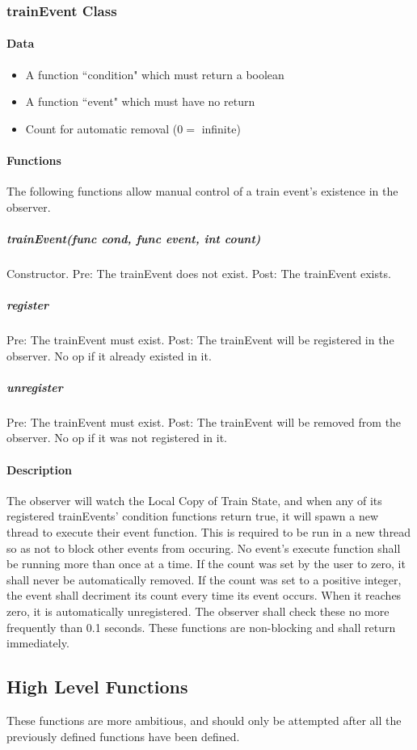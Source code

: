 \documentclass[a4paper,11pt,notitlepage]{article}
\def\LC{Local Copy of Train State\xspace}
\begin{document}
\subsubsection{trainEvent Class}
\paragraph{Data}
\begin{itemize}
\item A function ``condition" which must return a boolean
\item A function ``event" which must have no return
\item Count for automatic removal ($0 =$ infinite)
\end{itemize}
\paragraph{Functions}
The following functions allow manual control of a train event's existence in the observer.
\subparagraph{trainEvent(func cond, func event, int count)} Constructor. Pre: The trainEvent does not exist. Post: The trainEvent exists.
\subparagraph{register} Pre: The trainEvent must exist. Post: The trainEvent will be registered in the observer. No op if it already existed in it.
\subparagraph{unregister} Pre: The trainEvent must exist. Post: The trainEvent will be removed from the observer. No op if it was not registered in it.
\paragraph{Description}
The observer will watch the \LC, and when any of its registered trainEvents' condition functions return true, it will spawn a new thread to execute their event function. This is required to be run in a new thread so as not to block other events from occuring. No event's execute function shall be running more than once at a time. If the count was set by the user to zero, it shall never be automatically removed. If the count was set to a positive integer, the event shall decriment its count every time its event occurs. When it reaches zero, it is automatically unregistered. The observer shall check these no more frequently than 0.1 seconds.
These functions are non-blocking and shall return immediately.

\subsection{High Level Functions}
These functions are more ambitious, and should only be attempted after all the previously defined functions have been defined.
\end{document}
